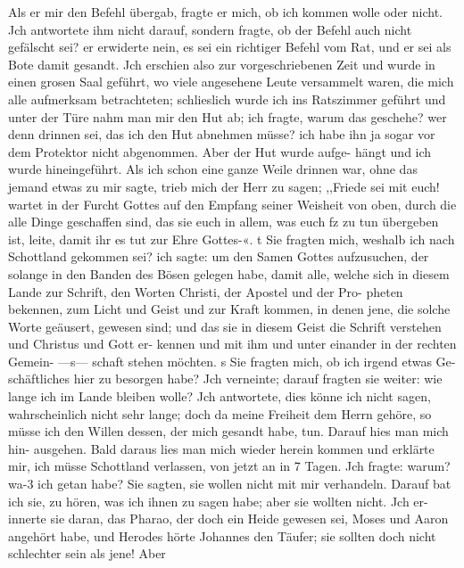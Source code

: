 Als er mir den Befehl übergab, fragte er mich, ob ich kommen
wolle oder nicht. Jch antwortete ihm nicht darauf, sondern
fragte, ob der Befehl auch nicht gefälscht sei? er erwiderte nein,
es sei ein richtiger Befehl vom Rat, und er sei als Bote damit
gesandt. Jch erschien also zur vorgeschriebenen Zeit und wurde in
einen grosen Saal geführt, wo viele angesehene Leute versammelt
waren, die mich alle aufmerksam betrachteten; schlieslich wurde
ich ins Ratszimmer geführt und unter der Türe nahm man mir
den Hut ab; ich fragte, warum das geschehe? wer denn drinnen
sei, das ich den Hut abnehmen müsse? ich habe ihn ja sogar vor
dem Protektor nicht abgenommen. Aber der Hut wurde aufge-
hängt und ich wurde hineingeführt. Als ich schon eine ganze
Weile drinnen war, ohne das jemand etwas zu mir sagte, trieb
mich der Herr zu sagen; ,,Friede sei mit euch! wartet in der
Furcht Gottes auf den Empfang seiner Weisheit von oben, durch
die alle Dinge geschaffen sind, das sie euch in allem, was euch
fz zu tun übergeben ist, leite, damit ihr es tut zur Ehre Gottes-«.
t Sie fragten mich, weshalb ich nach Schottland gekommen sei? ich
sagte: um den Samen Gottes aufzusuchen, der solange in den
Banden des Bösen gelegen habe, damit alle, welche sich in diesem
Lande zur Schrift, den Worten Christi, der Apostel und der Pro-
pheten bekennen, zum Licht und Geist und zur Kraft kommen, in
denen jene, die solche Worte geäusert, gewesen sind; und das sie
in diesem Geist die Schrift verstehen und Christus und Gott er-
kennen und mit ihm und unter einander in der rechten Gemein-
—s— schaft stehen möchten. s Sie fragten mich, ob ich irgend etwas Ge-
schäftliches hier zu besorgen habe? Jch verneinte; darauf fragten
sie weiter: wie lange ich im Lande bleiben wolle? Jch antwortete,
dies könne ich nicht sagen, wahrscheinlich nicht sehr lange; doch
da meine Freiheit dem Herrn gehöre, so müsse ich den Willen
dessen, der mich gesandt habe, tun. Darauf hies man mich hin-
ausgehen. Bald daraus lies man mich wieder herein kommen
und erklärte mir, ich müsse Schottland verlassen, von jetzt an in
7 Tagen. Jch fragte: warum? wa-3 ich getan habe? Sie sagten,
sie wollen nicht mit mir verhandeln. Darauf bat ich sie, zu hören,
was ich ihnen zu sagen habe; aber sie wollten nicht. Jch er-
innerte sie daran, das Pharao, der doch ein Heide gewesen sei,
Moses und Aaron angehört habe, und Herodes hörte Johannes
den Täufer; sie sollten doch nicht schlechter sein als jene! Aber


